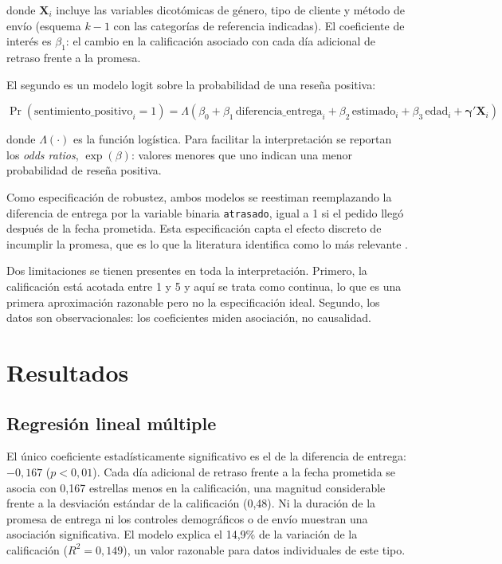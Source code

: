 \documentclass[11pt]{article}
\begin{document}
donde $\mathbf{X}_i$ incluye las variables dicotómicas de género, tipo de
cliente y método de envío (esquema $k-1$ con las categorías de referencia
indicadas). El coeficiente de interés es $\beta_1$: el cambio en la
calificación asociado con cada día adicional de retraso frente a la promesa.

El segundo es un modelo logit sobre la probabilidad de una reseña positiva:

\begin{equation}
\Pr(\text{sentimiento\_positivo}_i = 1) =
\Lambda\!\left(\beta_0 + \beta_1\,\text{diferencia\_entrega}_i
+ \beta_2\,\text{estimado}_i + \beta_3\,\text{edad}_i
+ \mathbf{\gamma}'\mathbf{X}_i\right)
\end{equation}

donde $\Lambda(\cdot)$ es la función logística. Para facilitar la
interpretación se reportan los \textit{odds ratios}, $\exp(\beta)$: valores
menores que uno indican una menor probabilidad de reseña positiva.

Como especificación de robustez, ambos modelos se reestiman reemplazando la
diferencia de entrega por la variable binaria \texttt{atrasado}, igual a 1 si
el pedido llegó después de la fecha prometida. Esta especificación capta el
efecto discreto de incumplir la promesa, que es lo que la literatura identifica
como lo más relevante \parencite{akturk2022,ravula2023}.

Dos limitaciones se tienen presentes en toda la interpretación. Primero, la
calificación está acotada entre 1 y 5 y aquí se trata como continua, lo que es
una primera aproximación razonable pero no la especificación ideal. Segundo,
los datos son observacionales: los coeficientes miden asociación, no
causalidad.

\section{Resultados}

\subsection{Regresión lineal múltiple}



El único coeficiente estadísticamente significativo es el de la diferencia de
entrega: $-0,167$ ($p<0{,}01$). Cada día adicional de retraso frente a la
fecha prometida se asocia con 0,167 estrellas menos en la calificación, una
magnitud considerable frente a la desviación estándar de la calificación
(0,48). Ni la duración de la promesa de entrega ni los controles demográficos
o de envío muestran una asociación significativa. El modelo explica el 14,9\%
de la variación de la calificación ($R^2 = 0{,}149$), un valor razonable para
datos individuales de este tipo.
\end{document}
